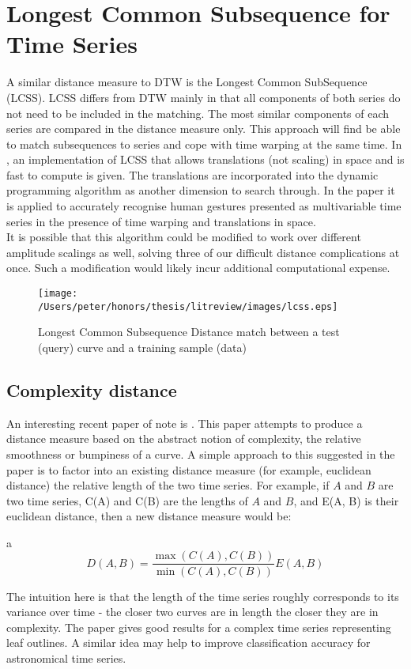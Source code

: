 	\section{Longest Common Subsequence for Time Series}
	A similar distance measure to DTW is the Longest Common SubSequence (LCSS). LCSS differs from DTW mainly in that all components of both series do not need to be included in the matching. The most similar components of each series are compared in the distance measure only. This approach will find be able to match subsequences to series and cope with time warping at the same time. In \citep{vlachos2002discovering}, an implementation of LCSS that allows translations (not scaling) in space and is fast to compute is given. The translations are incorporated into the dynamic programming algorithm as another dimension to search through.  In the paper it is applied to accurately recognise human gestures presented as multivariable time series in the presence of time warping and translations in space.
	\\
	It is possible that this algorithm could be modified to work over different amplitude scalings as well, solving three of our difficult distance complications at once. Such a modification would likely incur additional computational expense. 
	
	\begin{figure}[h!]
	\centering
	\texttt{[image: /Users/peter/honors/thesis/litreview/images/lcss.eps]}
	\label{fig:lcss}
	\caption{Longest Common Subsequence Distance match between a test (query) curve and a training sample (data)}
	\end{figure}
	
	\subsection{Complexity distance} 
	An interesting recent paper of note is \citep{batista2011complexity}. This paper attempts to produce a distance measure based on the abstract notion of complexity, the relative smoothness or bumpiness of a curve. A simple approach to this suggested in the paper is to factor into an existing distance measure (for example, euclidean distance) the relative length of the two time series. For example, if $A$ and $B$ are two time series, C(A) and C(B) are the lengths of $A$ and $B$, and E(A, B) is their euclidean distance, then a new distance measure would be:
	\begin{center}a
	\begin{equation*}
		D(A,B) = \frac{\max(C(A), C(B))}{\min(C(A), C(B))}E(A,B)
	\end{equation*}
	\end{center}
	 The intuition here is that the length of the time series roughly corresponds to its variance over time - the closer two curves are in length the closer they are in complexity. The paper gives good results for a complex time series representing leaf outlines. A similar idea may help to improve classification accuracy for astronomical time series.
	
